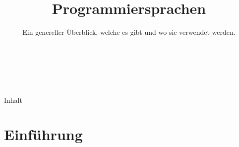 

\title{Programmiersprachen}
\subtitle{Ein genereller Überblick, welche es gibt und wo sie verwendet werden.}




\backgroundTitle
\begin{frame}
    \thispagestyle{empty}
    \begin{columns}
        \column{0.6\paperwidth}
        \color{hhuBlau}
        \LARGE \inserttitle\\[\baselineskip]
        \large \insertauthor
    \end{columns}
\end{frame}
\backgroundNormal

\begin{frame}{Inhalt}
    \thispagestyle{empty}
    \tableofcontents
\end{frame}


\section{Einführung}

%



